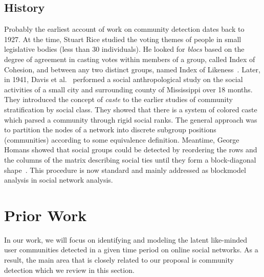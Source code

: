 \documentclass[sigconf]{acmart}
\begin{document}
\subsection{History}
Probably the earliest account of work on community detection dates back to 1927. At the time, Stuart Rice studied the voting themes of people in small legislative bodies (less than 30 individuals). He looked for \textit{blocs} based on the degree of agreement in casting votes within members of a group, called Index of Cohesion, and between any two distinct groups, named Index of Likeness~\cite{10.2307/1945514}. Later, in 1941, Davis et al.~\cite{davis1941deep} performed a social anthropological study on the social activities of a small city and surrounding county of Mississippi over 18 months. They introduced the concept of \textit{caste} to the earlier studies of community stratification by social class. They showed that there is a system of colored caste which parsed a community through rigid social ranks. The general approach was to partition the nodes of a network into discrete subgroup positions (communities) according to some equivalence definition. Meantime, George Homans showed that social groups could be detected by reordering the rows and the columns of the matrix describing social ties until they form a block-diagonal shape~\cite{homans2013human}. This procedure is now standard and mainly addressed as blockmodel analysis in social network analysis. 

\section{Prior Work}
In our work, we will focus on identifying and modeling the latent like-minded user communities detected in a given time period on online social networks. As a result, the main area that is closely related to our proposal is community detection which we review in this section. 
\end{document}
